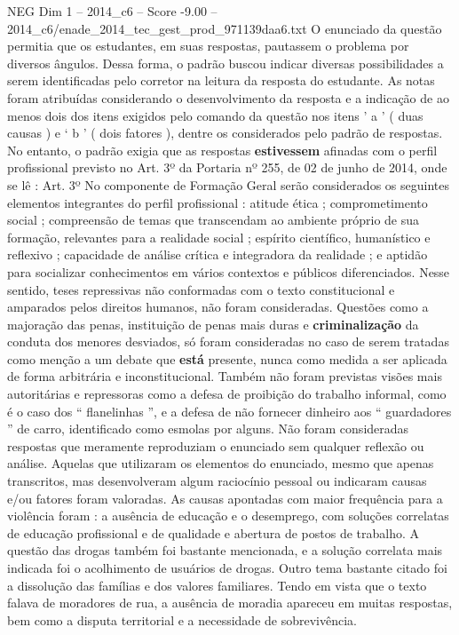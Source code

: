 \begin{textsample}{NEG Dim 1 – 2014\_c6 – Score -9.00 – 2014\_c6/enade\_2014\_tec\_gest\_prod\_971139daa6.txt}
O enunciado da questão permitia que os estudantes, em suas respostas, pautassem o problema por diversos ângulos.
Dessa forma, o padrão buscou indicar diversas possibilidades a serem identificadas pelo corretor na leitura da resposta do estudante.
As notas foram atribuídas considerando o desenvolvimento da resposta e a indicação de ao menos dois dos itens exigidos pelo comando da questão nos itens ’ a ’ ( duas causas ) e ‘ b ’ ( dois fatores ), dentre os considerados pelo padrão de respostas.
No entanto, o padrão exigia que as respostas \textbf{estivessem} afinadas com o perfil profissional previsto no Art. 3º da Portaria nº 255, de 02 de junho de 2014, onde se lê : Art. 3º No componente de Formação Geral serão considerados os seguintes elementos integrantes do perfil profissional : atitude ética ; comprometimento social ; compreensão de temas que transcendam ao ambiente próprio de sua formação, relevantes para a realidade social ; espírito científico, humanístico e reflexivo ; capacidade de análise crítica e integradora da realidade ; e aptidão para socializar conhecimentos em vários contextos e públicos diferenciados.
Nesse sentido, teses repressivas não conformadas com o texto constitucional e amparados pelos direitos humanos, não foram consideradas.
Questões como a majoração das penas, instituição de penas mais duras e \textbf{criminalização} da conduta dos menores desviados, só foram consideradas no caso de serem tratadas como menção a um debate que \textbf{está} presente, nunca como medida a ser aplicada de forma arbitrária e inconstitucional.
Também não foram previstas visões mais autoritárias e repressoras como a defesa de proibição do trabalho informal, como é o caso dos “ flanelinhas ”, e a defesa de não fornecer dinheiro aos “ guardadores ” de carro, identificado como esmolas por alguns.
Não foram consideradas respostas que meramente reproduziam o enunciado sem qualquer reflexão ou análise.
Aquelas que utilizaram os elementos do enunciado, mesmo que apenas transcritos, mas desenvolveram algum raciocínio pessoal ou indicaram causas e/ou fatores foram valoradas.
As causas apontadas com maior frequência para a violência foram : a ausência de educação e o desemprego, com soluções correlatas de educação profissional e de qualidade e abertura de postos de trabalho.
A questão das drogas também foi bastante mencionada, e a solução correlata mais indicada foi o acolhimento de usuários de drogas.
Outro tema bastante citado foi a dissolução das famílias e dos valores familiares.
Tendo em vista que o texto falava de moradores de rua, a ausência de moradia apareceu em muitas respostas, bem como a disputa territorial e a necessidade de sobrevivência.

\end{textsample}
